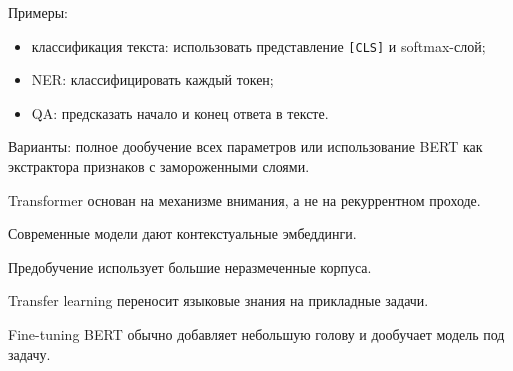 Примеры:
\begin{itemize}
    \item классификация текста: использовать представление \texttt{[CLS]} и softmax-слой;
    \item NER: классифицировать каждый токен;
    \item QA: предсказать начало и конец ответа в тексте.
\end{itemize}

Варианты: полное дообучение всех параметров или использование BERT как экстрактора признаков с замороженными слоями.

\begin{important}
    \item Transformer основан на механизме внимания, а не на рекуррентном проходе.
    \item Современные модели дают контекстуальные эмбеддинги.
    \item Предобучение использует большие неразмеченные корпуса.
    \item Transfer learning переносит языковые знания на прикладные задачи.
    \item Fine-tuning BERT обычно добавляет небольшую голову и дообучает модель под задачу.
\end{important}
